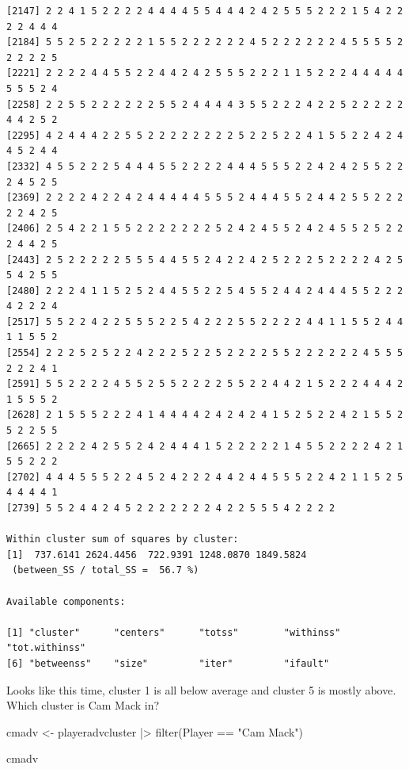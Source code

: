 \documentclass[
  letterpaper,
  DIV=11,
  numbers=noendperiod]{scrreprt}
\newenvironment{Shaded}{\begin{snugshade}}{\end{snugshade}}
\newcommand{\FunctionTok}[1]{\textcolor[rgb]{0.28,0.35,0.67}{#1}}
\newcommand{\NormalTok}[1]{\textcolor[rgb]{0.00,0.23,0.31}{#1}}
\newcommand{\OtherTok}[1]{\textcolor[rgb]{0.00,0.23,0.31}{#1}}
\newcommand{\SpecialCharTok}[1]{\textcolor[rgb]{0.37,0.37,0.37}{#1}}
\newcommand{\StringTok}[1]{\textcolor[rgb]{0.13,0.47,0.30}{#1}}
\begin{document}
\begin{verbatim}
[2147] 2 2 4 1 5 2 2 2 2 4 4 4 4 5 5 4 4 4 2 4 2 5 5 5 2 2 2 1 5 4 2 2 2 2 4 4 4
[2184] 5 5 2 5 2 2 2 2 2 1 5 5 2 2 2 2 2 2 4 5 2 2 2 2 2 2 4 5 5 5 5 2 2 2 2 2 5
[2221] 2 2 2 2 4 4 5 5 2 2 4 4 2 4 2 5 5 5 2 2 2 1 1 5 2 2 2 4 4 4 4 4 5 5 5 2 4
[2258] 2 2 5 5 2 2 2 2 2 2 5 5 2 4 4 4 4 3 5 5 2 2 2 4 2 2 5 2 2 2 2 2 4 4 2 5 2
[2295] 4 2 4 4 4 2 2 5 5 2 2 2 2 2 2 2 2 5 2 2 5 2 2 4 1 5 5 2 2 4 2 4 4 5 2 4 4
[2332] 4 5 5 2 2 2 5 4 4 4 5 5 2 2 2 2 4 4 4 5 5 5 2 2 4 2 4 2 5 5 2 2 2 4 5 2 5
[2369] 2 2 2 2 4 2 2 4 2 4 4 4 4 4 5 5 5 2 4 4 4 5 5 2 4 4 2 5 5 2 2 2 2 2 4 2 5
[2406] 2 5 4 2 2 1 5 5 2 2 2 2 2 2 2 5 2 4 2 4 5 5 2 4 2 4 5 5 2 5 2 2 2 4 4 2 5
[2443] 2 5 2 2 2 2 2 5 5 5 4 4 5 5 2 4 2 2 4 2 5 2 2 2 5 2 2 2 2 4 2 5 5 4 2 5 5
[2480] 2 2 2 4 1 1 5 2 5 2 4 4 5 5 2 2 5 4 5 5 2 4 4 2 4 4 4 5 5 2 2 2 4 2 2 2 4
[2517] 5 5 2 2 4 2 2 5 5 5 2 2 5 4 2 2 2 5 5 2 2 2 2 4 4 1 1 5 5 2 4 4 1 1 5 5 2
[2554] 2 2 2 5 2 5 2 2 4 2 2 2 5 2 2 5 2 2 2 2 5 5 2 2 2 2 2 2 4 5 5 5 2 2 2 4 1
[2591] 5 5 2 2 2 2 4 5 5 2 5 5 2 2 2 2 5 5 2 2 4 4 2 1 5 2 2 2 4 4 4 2 1 5 5 5 2
[2628] 2 1 5 5 5 2 2 2 4 1 4 4 4 4 2 4 2 4 2 4 1 5 2 5 2 2 4 2 1 5 5 2 5 2 2 5 5
[2665] 2 2 2 2 4 2 5 5 2 4 2 4 4 4 1 5 2 2 2 2 2 1 4 5 5 2 2 2 2 4 2 1 5 5 2 2 2
[2702] 4 4 4 5 5 5 2 2 4 5 2 4 2 2 2 4 4 2 4 4 5 5 5 2 2 4 2 1 1 5 2 5 4 4 4 4 1
[2739] 5 5 2 4 4 2 4 5 2 2 2 2 2 2 2 4 2 2 5 5 5 4 2 2 2 2

Within cluster sum of squares by cluster:
[1]  737.6141 2624.4456  722.9391 1248.0870 1849.5824
 (between_SS / total_SS =  56.7 %)

Available components:

[1] "cluster"      "centers"      "totss"        "withinss"     "tot.withinss"
[6] "betweenss"    "size"         "iter"         "ifault"      
\end{verbatim}

Looks like this time, cluster 1 is all below average and cluster 5 is
mostly above. Which cluster is Cam Mack in?

\begin{Shaded}
\end{Shaded}

\begin{Shaded}
\begin{Highlighting}[]
\NormalTok{cmadv }\OtherTok{\textless{}{-}}\NormalTok{ playeradvcluster }\SpecialCharTok{|\textgreater{}} \FunctionTok{filter}\NormalTok{(Player }\SpecialCharTok{==} \StringTok{"Cam Mack"}\NormalTok{)}

\NormalTok{cmadv}
\end{Highlighting}
\end{Shaded}
\end{document}
